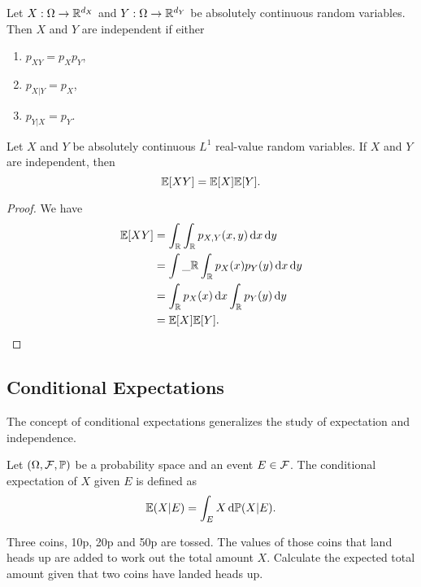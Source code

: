 \begin{proposition}
 Let $X:\Omega\to\mathbb{R}^{d_X}$ and $Y:\Omega\to\mathbb{R}^{d_Y}$ be absolutely continuous random variables. Then $X$ and $Y$ are independent if either
 \begin{enumerate}[label=(\arabic*)]
  \item $p_{XY}=p_Xp_Y$,
  \item $p_{X|Y}=p_X$,
  \item $p_{Y|X}=p_Y$.
 \end{enumerate}
\end{proposition}

\begin{proposition}
 \label{theorem:independent-expectation}
 Let $X$ and $Y$ be absolutely continuous $L^1$ real-value random variables. If $X$ and $Y$ are independent, then
 \begin{equation}
  \mathbb{E}[XY]=\mathbb{E}[X]\mathbb{E}[Y].
 \end{equation}
\end{proposition}

\begin{proof}
 We have
 \begin{align*}
  \mathbb{E}[XY]
   & = \int_{\mathbb{R}}\int_{\mathbb{R}}p_{X,Y}(x,y)\,\mathrm{d} x\,\mathrm{d} y  \\
   & = \int\_{\mathbb{R}}\int_{\mathbb{R}}p_X(x)p_Y(y)\,\mathrm{d} x\,\mathrm{d} y \\
   & =\int_{\mathbb{R}}p_X(x)\,\mathrm{d} x\int_{\mathbb{R}}p_Y(y)\,\mathrm{d} y   \\
   & =\mathbb{E}[X]\mathbb{E}[Y].
 \end{align*}
\end{proof}

\subsection{Conditional Expectations}
The concept of conditional expectations generalizes the study of expectation and independence.

\begin{definition}
 Let $(\Omega, \mathcal{F},\mathbb{P})$ be a probability space and an event $E\in\mathcal{F}$. The conditional expectation of $X$ given $E$ is defined as
 \begin{equation}
  \mathbb{E}(X|E)=\int_{E}X\,\mathrm{d} \mathbb{P}(X|E).
 \end{equation}
\end{definition}

\begin{example}
 Three coins, 10p, 20p and 50p are tossed. The values of those coins that land heads up are added to work out the total amount $X$. Calculate the expected total amount given that two coins have landed heads up.
\end{example}

